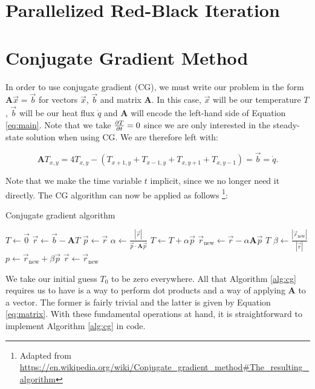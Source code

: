 \documentclass[paper=a4, fontsize=11pt]{scrartcl} %
\numberwithin{equation}{section} %
\numberwithin{figure}{section} %
\numberwithin{table}{section} %
\newcommand{\matr}[1]{\mathbf{#1}}
\begin{document}
\section{Parallelized Red-Black Iteration}


\section{Conjugate Gradient Method}

In order to use conjugate gradient (CG), we must write our problem in the form $\matr{A}\vec{x} = \vec{b}$ for vectors $\vec{x}$, $\vec{b}$ and matrix $\matr{A}$. In this case, $\vec{x}$ will be our temperature $T$, $\vec{b}$ will be our heat flux $\dot{q}$ and $\matr{A}$ will encode the left-hand side of Equation \ref{eq:main}. Note that we take ${\partial T \over \partial t} = 0$ since we are only interested in the steady-state solution when using CG. We are therefore left with:

\begin{equation}
	\matr{A}T_{x,y} = 4T_{x,y} - (T_{x+1,y} + T_{x-1,y} + T_{x,y+1} + T_{x,y-1}) = \vec{b} = \dot{q}.
	\label{eq:matrix}
\end{equation}

Note that we make the time variable $t$ implicit, since we no longer need it directly. The CG algorithm can now be applied as follows \footnote{Adapted from \url{https://en.wikipedia.org/wiki/Conjugate_gradient_method#The_resulting_algorithm}}:

\begin{algorithm}[H]
\caption{Conjugate gradient algorithm}
\begin{algorithmic}
	\REQUIRE{$\matr{A}$, $\vec{b}$, $\epsilon$}
	\STATE $T \gets \vec{0}$
	\STATE $\vec{r} \gets \vec{b} - \matr{A}T$  
	\STATE $\vec{p} \gets \vec{r}$
	\LOOP
		\STATE $\alpha \gets \frac{|\vec{r}|}{\vec{p} \cdot \matr{A}\vec{p}}$
		\STATE $T \gets T + \alpha \vec{p}$
		\STATE $\vec{r}_{\mathrm{new}} \gets \vec{r} - \alpha\matr{A}\vec{p}$
			\RETURN $T$
		\ENDIF
		\STATE $\beta \gets \frac{|\vec{r}_{\mathrm{new}}|}{|\vec{r}|}$
		\STATE $p \gets \vec{r}_{\mathrm{new}} + \beta\vec{p}$
		\STATE $\vec{r} \gets \vec{r}_{\mathrm{new}}$
	\ENDLOOP
\end{algorithmic}
\label{alg:cg}
\end{algorithm}

We take our initial guess $T_0$ to be zero everywhere. All that Algorithm \ref{alg:cg} requires us to have is a way to perform dot products and a way of applying $\matr{A}$ to a vector. The former is fairly trivial and the latter is given by Equation \ref{eq:matrix}. With these fundamental operations at hand, it is straightforward to implement Algorithm \ref{alg:cg} in code. \linebreak
\end{document}
